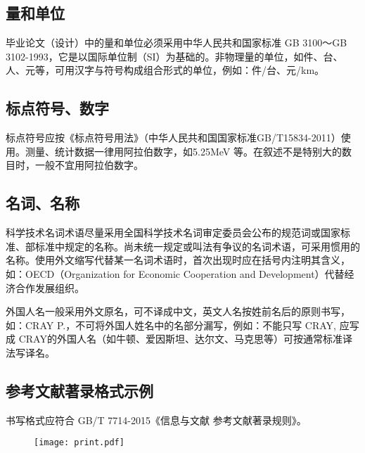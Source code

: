\subsection{量和单位}
毕业论文（设计）中的量和单位必须采用中华人民共和国家标准 GB 3100～GB 3102-1993，它是以国际单位制（SI）为基础的。非物理量的单位，如件、台、人、元等，可用汉字与符号构成组合形式的单位，例如：件/台、元/km。
\subsection{标点符号、数字}
标点符号应按《标点符号用法》（中华人民共和国国家标准GB/T15834-2011）使用。测量、统计数据一律用阿拉伯数字，如5.25MeV 等。在叙述不是特别大的数目时，一般不宜用阿拉伯数字。
\subsection{名词、名称}
科学技术名词术语尽量采用全国科学技术名词审定委员会公布的规范词或国家标准、部标准中规定的名称。尚未统一规定或叫法有争议的名词术语，可采用惯用的名称。使用外文缩写代替某一名词术语时，首次出现时应在括号内注明其含义，如：OECD（Organization for Economic Cooperation and Development）代替经济合作发展组织。

外国人名一般采用外文原名，可不译成中文，英文人名按姓前名后的原则书写，如：CRAY P.，不可将外国人姓名中的名部分漏写，例如：不能只写 CRAY, 应写成 CRAY的外国人名（如牛顿、爱因斯坦、达尔文、马克思等）可按通常标准译法写译名。
\subsection{参考文献著录格式示例}
书写格式应符合 GB/T 7714-2015《信息与文献 参考文献著录规则》。

\vspace{2cm}

\begin{figure}[htbp]
\centering
\texttt{[image: print.pdf]}
\end{figure}